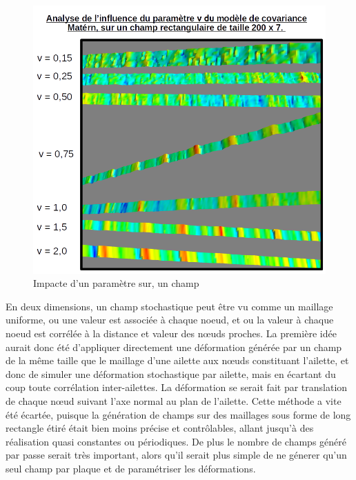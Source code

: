 \documentclass[a4paper,10pt]{article}
\begin{document}
\begin{figure}[H]
   \centering   
   \includegraphics[scale=0.3]{maternNu.png}
      \caption{Impacte d'un paramètre sur, un champ}
         \label{maternNu}
\end{figure}

En deux dimensions, un champ stochastique peut être vu comme un maillage uniforme, ou une valeur est associée à chaque noeud, et ou la valeur à chaque noeud est corrélée à la distance et valeur des nœuds proches. La première idée aurait donc été d'appliquer directement une déformation générée par un champ de la même taille que le maillage d'une ailette aux nœuds constituant l'ailette, et donc de simuler une déformation stochastique par ailette, mais en écartant du coup toute corrélation inter-ailettes.
La déformation se serait fait par translation de chaque nœud suivant l'axe normal au plan de l'ailette.
Cette méthode a vite été écartée, puisque la génération de champs sur des maillages sous forme de long rectangle étiré était bien moins précise et contrôlables, allant jusqu'à des réalisation quasi constantes ou périodiques. De plus le nombre de champs généré par passe serait très important, alors qu'il serait plus simple de ne  génerer qu'un seul champ par plaque et de paramétriser les déformations.\\
\end{document}

